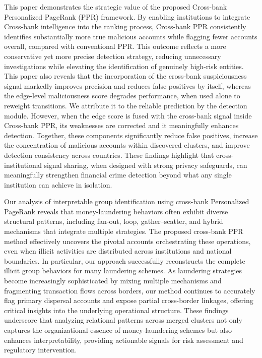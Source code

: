 This paper demonstrates the strategic value of the proposed Cross-bank Personalized PageRank (PPR) framework. By enabling institutions to integrate Cross-bank intelligence into the ranking process, Cross-bank PPR consistently identifies substantially more true malicious accounts while flagging fewer accounts overall, compared with conventional PPR. This outcome reflects a more conservative yet more precise detection strategy, reducing unnecessary investigations while elevating the identification of genuinely high-risk entities. This paper also reveals that the incorporation of the cross-bank suspiciousness signal markedly improves precision and reduces false positives by itself, whereas the edge-level maliciousness score degrades performance, when used alone to reweight transitions. We attribute it to the reliable prediction by the detection module. However, when the edge score is fused with the cross-bank signal inside Cross-bank PPR, its weaknesses are corrected and it meaningfully enhances detection. Together, these components significantly reduce false positives, increase the concentration of malicious accounts within discovered clusters, and improve detection consistency across countries. These findings highlight that cross-institutional signal sharing, when designed with strong privacy safeguards, can meaningfully strengthen financial crime detection beyond what any single institution can achieve in isolation.

Our analysis of interpretable group identification using cross-bank Personalized PageRank reveals that money-laundering behaviors often exhibit diverse structural patterns, including fan-out, loop, gather–scatter, and hybrid mechanisms that integrate multiple strategies. The proposed cross-bank PPR method effectively uncovers the pivotal accounts orchestrating these operations, even when illicit activities are distributed across institutions and national boundaries. In particular, our approach successfully reconstructs the complete illicit group behaviors for many laundering schemes. As laundering strategies become increasingly sophisticated by mixing multiple mechanisms and fragmenting transaction flows across borders, our method continues to accurately flag primary dispersal accounts and expose partial cross-border linkages, offering critical insights into the underlying operational structure. These findings underscore that analyzing relational patterns across merged clusters not only captures the organizational essence of money-laundering schemes but also enhances interpretability, providing actionable signals for risk assessment and regulatory intervention.


